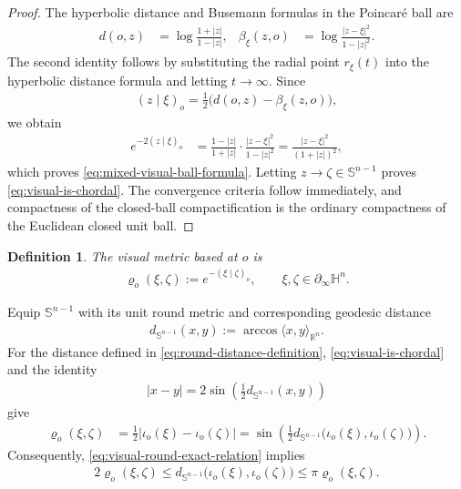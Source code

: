 \documentclass[11pt]{amsart}
\theoremstyle{plain}
\theoremstyle{plain}
\newtheorem{definition}[theorem]{Definition}
\theoremstyle{plain}
\newcommand{\Hn}{\mathbb H^n}
\newcommand{\bdry}{\partial_\infty}
\numberwithin{equation}{section}
\begin{document}
\begin{proof}
The hyperbolic distance and Busemann formulas in the Poincar\'e ball are
\begin{align}
d(o,z)
&=
\log\frac{1+|z|}{1-|z|},
&
\beta_\xi(z,o)
&=
\log\frac{|z-\xi|^2}{1-|z|^2}.
\nonumber
\end{align}
The second identity follows by substituting the radial point
\(r_\xi(t)\) into the hyperbolic distance formula and letting
\(t\to\infty\).  Since
\begin{align}
(z\mid\xi)_o
=
\frac12\bigl(d(o,z)-\beta_\xi(z,o)\bigr),
\nonumber
\end{align}
we obtain
\begin{align}
e^{-2(z\mid\xi)_o}
&=
\frac{1-|z|}{1+|z|}
\cdot
\frac{|z-\xi|^2}{1-|z|^2}
=
\frac{|z-\xi|^2}{(1+|z|)^2},
\nonumber
\end{align}
which proves \eqref{eq:mixed-visual-ball-formula}.  Letting
\(z\to\zeta\in\mathbb S^{n-1}\) proves
\eqref{eq:visual-is-chordal}.  The convergence criteria follow
immediately, and compactness of the closed-ball compactification is the
ordinary compactness of the Euclidean closed unit ball.
\end{proof}

\begin{definition}\label{def:visual-metric-ball-identification}
The visual metric based at \(o\) is
\begin{align}
\varrho_o(\xi,\zeta)
:=
e^{-(\xi\mid\zeta)_o},
\qquad
\xi,\zeta\in\bdry\Hn.
\label{eq:visual-metric-definition}
\end{align}
\end{definition}

Equip \(\mathbb S^{n-1}\) with its unit round metric and corresponding
geodesic distance
\begin{align}
d_{\mathbb S^{n-1}}(x,y)
:=
\arccos\langle x,y\rangle_{\mathbb R^n}.
\label{eq:round-distance-definition}
\end{align}
For the distance defined in
\eqref{eq:round-distance-definition}, \eqref{eq:visual-is-chordal} and the identity
\begin{align}
|x-y|
=
2\sin\left(\frac12d_{\mathbb S^{n-1}}(x,y)\right)
\nonumber
\end{align}
give
\begin{align}
\varrho_o(\xi,\zeta)
&=\frac12
\left|
\iota_o(\xi)-\iota_o(\zeta)
\right|=\sin\left(
\frac12 d_{\mathbb S^{n-1}}
\bigl(\iota_o(\xi),\iota_o(\zeta)\bigr)
\right).
\label{eq:visual-round-exact-relation}
\end{align}
Consequently, \eqref{eq:visual-round-exact-relation} implies
\begin{align}
2\varrho_o(\xi,\zeta)
\leq
d_{\mathbb S^{n-1}}
\bigl(\iota_o(\xi),\iota_o(\zeta)\bigr)
\leq
\pi\varrho_o(\xi,\zeta).
\label{eq:visual-round-bilipschitz}
\end{align}
\end{document}
